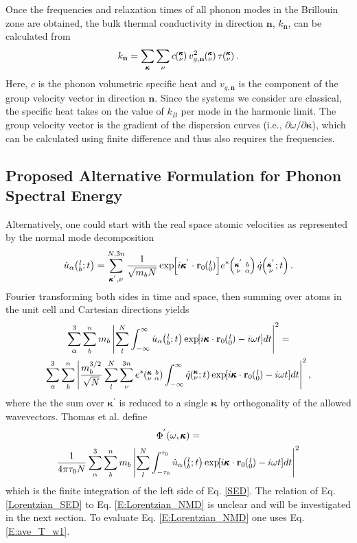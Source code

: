\documentclass[twocolumn,10pt]{asme2e}
\newcommand{\SUMprime}[2]{\ifthenelse{\equal{#1}{0}}{\sum_{\alpha_{#2},b_{#2},l_{#2}}^{3,n,N}} {\ifthenelse{\equal{#1}{1}}{\sum_{\alpha_{#2},b_{#2}}^{3,n}}{\sum_{\pmb{\kappa}^{'}#2,\nu#2}^{N,3n}}}}
\newcommand{\EXP}[1]{\exp\mspace{-5.0mu}\left[#1\right]\mspace{-3.0mu}}
\newcommand{\ab}[2]{\mspace{-4.0mu}\left(\mspace{-8.0mu}\begin{smallmatrix}&\ifthenelse{\equal{#1}{}}{a}{#1} \\&\ifthenelse{\equal{#2}{}}{b}{#2}\end{smallmatrix}\mspace{-3.0mu}\right)}
\newcommand{\kvba}{\mspace{-4.0mu}\left(\mspace{-8.0mu}\begin{smallmatrix} &\pmb{\kappa} &b \\ &\nu &\alpha\end{smallmatrix}\mspace{-3.0mu}\right)}
\newcommand{\kpvba}{\mspace{-4.0mu}\left(\mspace{-8.0mu}\begin{smallmatrix} &\pmb{\kappa}^{'} &b \\ &\nu &\alpha\end{smallmatrix}\mspace{-3.0mu}\right)}
\newcommand{\kvt}{\mspace{-4.0mu}\left(\mspace{-8.0mu}\begin{smallmatrix}&\pmb{\kappa} \\&\nu\end{smallmatrix}\mspace{-2.0mu};t\right)}
\newcommand{\kpvt}{\mspace{-4.0mu}\left(\mspace{-8.0mu}\begin{smallmatrix}&\pmb{\kappa}^{'} \\&\nu\end{smallmatrix}\mspace{-2.0mu};t\right)}
\newcommand{\kv}{\mspace{-4.0mu}\left(\mspace{-8.0mu}\begin{smallmatrix}&\pmb{\kappa} \\&\nu\end{smallmatrix}\mspace{-3.0mu}\right)}
\newcommand{\lbt}{\mspace{-4.0mu}\left(\mspace{-8.0mu}\begin{smallmatrix}&l \\&b\end{smallmatrix}\mspace{-2.0mu};t\right)}
\begin{document}
Once the frequencies and relaxation times of all phonon modes in the
Brillouin zone are obtained, the bulk thermal conductivity in direction
$\mathbf{n}$, $k_{\mathbf{n}}$, can be calculated from
\begin{equation}
	\label{E-size:k_bulk}
	k_{\mathbf{n}}=\sum_{\pmb{\kappa}} \sum_\nu c \kv v^{2}_{g,\mathbf{n}} \kv \tau \kv.
\end{equation}
Here, $c$ is the phonon volumetric specific heat and ${v}_{g,\mathbf{n}}$ is
the component of the group velocity vector in direction $\mathbf{n}$. Since the systems we consider are classical, the
specific heat takes on the value of $k_B$ per mode in the harmonic limit. The group
velocity vector is the gradient of the dispersion curves (i.e., $\partial
\omega /
\partial \pmb{\kappa}$), which can be calculated using finite difference and thus also requires the frequencies.

\subsection*{Proposed Alternative Formulation for Phonon Spectral Energy}\label{S:Properties}

Alternatively, one could start with the real space atomic velocities as represented by the normal mode decomposition \cite{dove1993}
\begin{equation}\label{E:udot_HLD}
\dot{u}_{\alpha}\lbt =  \SUMprime{2}{} \frac{1}{\sqrt{m_bN}} \EXP{i\pmb{\kappa}^{'}\cdot\mathbf{r}_0\ab{l}{0}} e^*\kpvba \dot{q}\kpvt{}{}{}.
\end{equation}
Fourier transforming both sides in time and space, then summing over atoms in the unit cell and Cartesian directions yields
\begin{multline}\label{SED}
\sum_\alpha^3 \sum_b^n m_b \left| \sum_l^N  \int_{-\infty}^{\infty} \dot{u}_{\alpha}\lbt \EXP{i\pmb{\kappa}\cdot\mathbf{r}_0\ab{l}{0}-i\omega t} dt \right|^2 =
\\ \sum_\alpha^3 \sum_b^n\left| \frac{m_b^{3/2}}{\sqrt{N}} \sum_l^N \sum_{\nu}^{3n} e^*\kvba \int_{-\infty}^{\infty}\dot{q}\kvt\EXP{i\pmb{\kappa}\cdot\mathbf{r}_0\ab{l}{0}-i\omega t}dt\right|^2 ,
\end{multline}
where the the sum over $\pmb{\kappa}^{'}$ is reduced to a single $\pmb{\kappa}$ by orthogonality of the allowed wavevectors. Thomas et al. \cite{thomas2010c} define
\begin{multline}\label{Lorentzian_SED}
\Phi^{'}(\omega,\pmb{\kappa}) =
\\ \frac{1}{4\pi\tau_0N} \sum_\alpha^3 \sum_b^n m_b \left| \sum_l^N  \int_{-\tau_0}^{\tau_0} \dot{u}_{\alpha}\lbt \EXP{i\pmb{\kappa}\cdot\mathbf{r}_0\ab{l}{0}-i\omega t} dt \right|^2
\end{multline}
which is the finite integration of the left side of Eq$.$ \eqref{SED}. The relation of Eq$.$ \eqref{Lorentzian_SED} to Eq$.$ \eqref{E:Lorentzian_NMD} is unclear and will be investigated in the next section. To evaluate Eq$.$ \eqref{E:Lorentzian_NMD} one uses Eq$.$ \eqref{E:ave_T_w1}.
\end{document}
